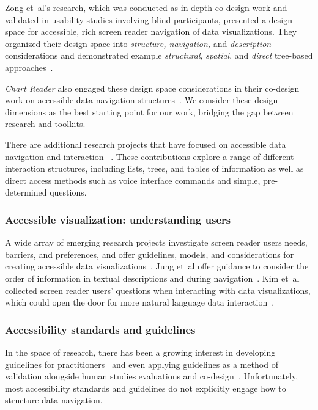 \documentclass[journal]{vgtc}                %
\newcommand{\ea}{{et~al\xperiod}\xspace}
\begin{document}
Zong \ea's research, which was conducted as in-depth co-design work and validated in usability studies involving blind participants, presented a design space for accessible, rich screen reader navigation of data visualizations. They organized their design space into \textit{structure, navigation,} and \textit{description} considerations and demonstrated example \textit{structural}, \textit{spatial}, and \textit{direct} tree-based approaches~\cite{Zong2022Rich}.

\textit{Chart Reader} also engaged these design space considerations in their co-design work on accessible data navigation structures~\cite{Thompson2023Chart}. We consider these design dimensions as the best starting point for our work, bridging the gap between research and toolkits.

There are additional research projects that have focused on accessible data navigation and interaction ~\cite{Sharif2022VoxLens,Sorge2016Polyfilling,Godfrey2018Accessible,Sharif2018evoGraphs}. These contributions explore a range of different interaction structures, including lists, trees, and tables of information as well as direct access methods such as voice interface commands and simple, pre-determined questions.

\subsubsection{Accessible visualization: understanding users}

A wide array of emerging research projects investigate screen reader users needs, barriers, and preferences, and offer guidelines, models, and considerations for creating accessible data visualizations~\cite{Sharif2021Understanding,Lundgard2022Accessible,Chundury2022Towards,Fan2023Accessibility}. Jung \ea offer guidance to consider the order of information in textual descriptions and during navigation~\cite{Jung2022Communicating}. Kim \ea collected screen reader users' questions when interacting with data visualizations, which could open the door for more natural language data interaction~\cite{Kim2023Exploring}.

\subsubsection{Accessibility standards and guidelines}
In the space of research, there has been a growing interest in developing guidelines for practitioners~\cite{Elavsky2022Chartability, Durant2022Ten} and even applying guidelines as a method of validation alongside human studies evaluations and co-design~\cite{Lundgard2019Sociotechnical,Zong2022Rich,Lundgard2022Accessible,Fan2023Accessibility}. Unfortunately, most accessibility standards and guidelines do not explicitly engage how to structure data navigation. 
\end{document}
